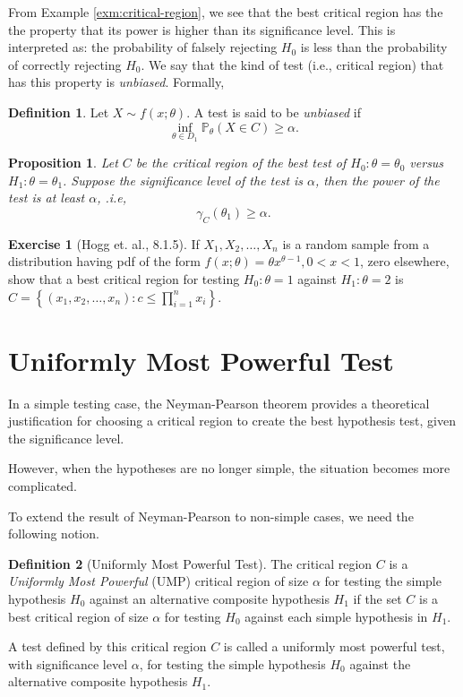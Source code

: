 \documentclass[
  openany]{book}
\newtheorem{proposition}{Proposition}[chapter]
\theoremstyle{definition}
\newtheorem{definition}{Definition}[chapter]
\theoremstyle{definition}
\theoremstyle{definition}
\newtheorem{exercise}{Exercise}[chapter]
\theoremstyle{definition}
\theoremstyle{remark}
\begin{document}
From Example \ref{exm:critical-region}, we see that the best critical region has the
the property that its power is higher than its significance level.
This is interpreted as: the probability of falsely rejecting \(H_0\) is less than
the probability of correctly rejecting \(H_0\).
We say that the kind of test (i.e., critical region) that has this property
is \emph{unbiased}. Formally,

\begin{definition}
Let \(X \sim f(x;\theta)\). A test is said to be \emph{unbiased} if
\[\inf_{\theta \in D_1} \mathbb{P}_{\theta} (X \in C) \geq \alpha.\]
\end{definition}

\begin{proposition}
Let \(C\) be the critical region of the best test of \(H_0: \theta = \theta_0\)
versus \(H_1: \theta = \theta_1\).
Suppose the significance level of the test is \(\alpha\), then the power of the test is at least \(\alpha\), .i.e,
\[\gamma_C (\theta_1) \geq \alpha.\]
\end{proposition}

\begin{exercise}[Hogg et. al., 8.1.5]
If \(X_1, X_2, \ldots, X_n\) is a random sample from a distribution having pdf of the form \(f(x ; \theta)=\theta x^{\theta-1}, 0<x<1\), zero elsewhere, show that a best critical region for testing \(H_0: \theta=1\) against \(H_1: \theta=2\) is \(C=\left\{\left(x_1, x_2, \ldots, x_n\right): c \leq \prod_{i=1}^n x_i\right\}\).
\end{exercise}

\hypertarget{uniformly-most-powerful-test}{%
\section{Uniformly Most Powerful Test}\label{uniformly-most-powerful-test}}

In a simple testing case, the Neyman-Pearson theorem provides a theoretical justification for
choosing a critical region to create the best hypothesis test, given
the significance level.

However, when the hypotheses are no longer simple, the situation becomes more complicated.

To extend the result of Neyman-Pearson to non-simple cases, we need the following notion.

\begin{definition}[Uniformly Most Powerful Test]
The critical region \(C\) is a \emph{Uniformly Most Powerful} (UMP) critical region
of size \(\alpha\) for testing the simple hypothesis \(H_0\) against an
alternative composite hypothesis \(H_1\) if the set \(C\) is a best critical
region of size \(\alpha\) for testing \(H_0\) against each simple
hypothesis in \(H_1\).

A test defined by this critical region \(C\) is
called a uniformly most powerful test, with significance level \(\alpha\),
for testing the simple hypothesis \(H_0\) against the alternative composite hypothesis \(H_1\).
\end{definition}
\end{document}
